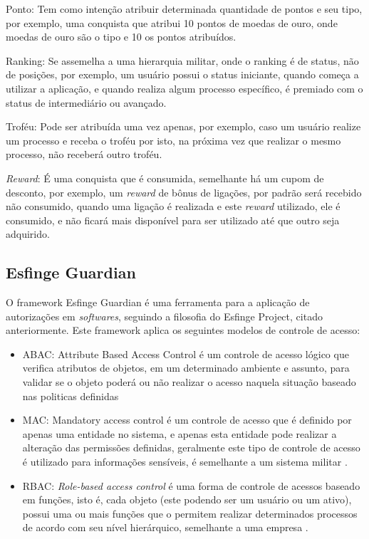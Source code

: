 \par Ponto: Tem como intenção atribuir determinada quantidade de pontos e seu tipo, por exemplo, uma conquista que atribui 10 pontos de moedas de ouro, onde moedas de ouro são o tipo e 10 os pontos atribuídos. 
\par Ranking: Se assemelha a uma hierarquia militar, onde o ranking é de status, não de posições, por exemplo, um usuário possui o status iniciante, quando começa a utilizar a aplicação, e quando realiza algum processo específico, é premiado com o status de intermediário ou avançado. 
\par Troféu: Pode ser atribuída uma vez apenas, por exemplo, caso um usuário realize um processo e receba o troféu por isto, na próxima vez que realizar o mesmo processo, não receberá outro troféu. 
\par \textit{Reward}: É uma conquista que é consumida, semelhante há um cupom de desconto, por exemplo, um \textit{reward} de bônus de ligações, por padrão será recebido não consumido, quando uma ligação é realizada e este \textit{reward} utilizado, ele é consumido, e não ficará mais disponível para ser utilizado até que outro seja adquirido.

\subsection{Esfinge Guardian}

\par O framework Esfinge Guardian é uma ferramenta para a aplicação de autorizações em \textit{softwares}, seguindo a filosofia do Esfinge Project, citado anteriormente. Este framework aplica os seguintes modelos de controle de acesso:
\begin{itemize}
    \item ABAC: Attribute Based Access Control é um controle de acesso lógico que verifica atributos de objetos, em um determinado ambiente e assunto, para validar se o objeto poderá ou não realizar o acesso naquela situação baseado nas politicas definidas \cite{hu2015attribute}
    \item MAC: Mandatory access control é um controle de acesso que é definido por apenas uma entidade no sistema, e apenas esta entidade pode realizar a alteração das permissões definidas, geralmente este tipo de controle de acesso é utilizado para informações sensíveis, é semelhante a um sistema militar \cite{lindqvist2006mandatory}.
    \item RBAC: \textit{Role-based access control} é uma forma de controle de acessos baseado em funções, isto é, cada objeto (este podendo ser um usuário ou um ativo), possui uma ou mais funções que o permitem realizar determinados processos de acordo com seu nível hierárquico, semelhante a uma empresa \cite{sandhu2000nist}.
\end{itemize}